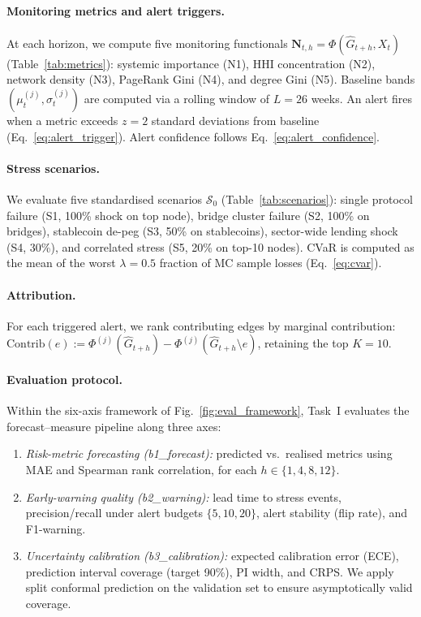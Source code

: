 \paragraph{Monitoring metrics and alert triggers.}
At each horizon, we compute five monitoring functionals $\mathbf{N}_{t,h}=\Phi(\widehat{G}_{t+h},X_t)$ (Table~\ref{tab:metrics}): systemic importance (N1), HHI concentration (N2), network density (N3), PageRank Gini (N4), and degree Gini (N5). Baseline bands $(\mu_t^{(j)}, \sigma_t^{(j)})$ are computed via a rolling window of $L=26$ weeks. An alert fires when a metric exceeds $z=2$ standard deviations from baseline (Eq.~\eqref{eq:alert_trigger}). Alert confidence follows Eq.~\eqref{eq:alert_confidence}.

\paragraph{Stress scenarios.}
We evaluate five standardised scenarios $\mathcal{S}_0$ (Table~\ref{tab:scenarios}): single protocol failure (S1, 100\% shock on top node), bridge cluster failure (S2, 100\% on bridges), stablecoin de-peg (S3, 50\% on stablecoins), sector-wide lending shock (S4, 30\%), and correlated stress (S5, 20\% on top-10 nodes). CVaR is computed as the mean of the worst $\lambda=0.5$ fraction of MC sample losses (Eq.~\eqref{eq:cvar}).

\paragraph{Attribution.}
For each triggered alert, we rank contributing edges by marginal contribution: $\mathrm{Contrib}(e) := \Phi^{(j)}(\widehat{G}_{t+h}) - \Phi^{(j)}(\widehat{G}_{t+h}\setminus e)$, retaining the top $K=10$.

\paragraph{Evaluation protocol.}
Within the six-axis framework of Fig.~\ref{fig:eval_framework}, Task~I evaluates the forecast--measure pipeline along three axes:
\begin{enumerate}[leftmargin=*,itemsep=1pt]
    \item \emph{Risk-metric forecasting (b1_forecast):} predicted vs.\ realised metrics using MAE and Spearman rank correlation, for each $h\in\{1,4,8,12\}$.
    \item \emph{Early-warning quality (b2_warning):} lead time to stress events, precision/recall under alert budgets $\{5,10,20\}$, alert stability (flip rate), and F1-warning.
    \item \emph{Uncertainty calibration (b3_calibration):} expected calibration error (ECE), prediction interval coverage (target 90\%), PI width, and CRPS. We apply split conformal prediction on the validation set to ensure asymptotically valid coverage.
\end{enumerate}

